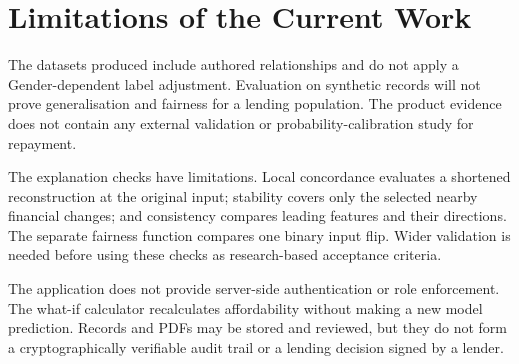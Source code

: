 \section{Limitations of the Current Work}
The datasets produced include authored relationships and do not apply a Gender-dependent label adjustment. Evaluation on synthetic records will not prove generalisation and fairness for a lending population. The product evidence does not contain any external validation or probability-calibration study for repayment.

The explanation checks have limitations. Local concordance evaluates a shortened reconstruction at the original input; stability covers only the selected nearby financial changes; and consistency compares leading features and their directions. The separate fairness function compares one binary input flip. Wider validation is needed before using these checks as research-based acceptance criteria.

The application does not provide server-side authentication or role enforcement. The what-if calculator recalculates affordability without making a new model prediction. Records and PDFs may be stored and reviewed, but they do not form a cryptographically verifiable audit trail or a lending decision signed by a lender.

